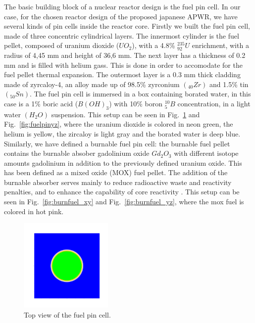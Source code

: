\documentclass[twocolumn,a4paper,10pt]{article}
\begin{document}
\par
The basic building block of a nuclear reactor design is the fuel pin cell. In our case, for the chosen reactor design of the proposed japanese APWR, we have several kinds of pin cells inside the reactor core. Firstly we built the fuel pin cell, made of three concentric cylindrical layers. The innermost cylinder is the fuel pellet, composed of uranium dioxide ($UO_2$), with a 4.8\% $^{235}_{92}U$ enrichment, with a radius of 4,45 mm and height of 36,6 mm. The next layer has a thickness of 0.2 mm and is filled with helium gass. This is done in order to accomodate for the fuel pellet thermal expansion. The outermost layer is a 0.3 mm thick cladding made of zyrcaloy-4, an alloy made up of 98.5\% zyrconium $(_{40}Zr)$ and 1.5\% tin $(_{50}Sn)$. The fuel pin cell is immersed in a box containing borated water, in this case is a 1\% boric acid ($B(OH)_3$) with 10\% boron $^{10}_{5}B$ concentration, in a light water $(H_2O)$ suspension. This setup can be seen in Fig.~\ref{fig:fuelpinxy} and Fig.~\ref{fig:fuelpinyz}, where the uranium dioxide is colored in neon green, the helium is yellow, the zircaloy is light gray and the borated water is deep blue. Similarly, we have defined a burnable fuel pin cell: the burnable fuel pellet contains the burnable absober gadolinium oxide $Gd_2O_3$ with different isotope amounts gadolinium \cite{BurnupFuel} in addition to the previously defined uranium oxide. This has been defined as a mixed oxide (MOX) fuel pellet. The addition of the burnable absorber serves mainly to reduce radioactive waste and reactivity penalties, and to enhance the capability of core reactivity \cite{APWR}. This setup can be seen in Fig.~\ref{fig:burnfuel_xy} and Fig.~\ref{fig:burnfuel_yz}, where the mox fuel is colored in hot pink.

\begin{figure}[ht]
  \centering
  \includegraphics[width=0.4\textwidth]{../Pictures/Fuelrods_plot_xy.png}
  \caption{Top view of the fuel pin cell.}
  \label{fig:fuelpinxy}
\end{figure}
\end{document}
